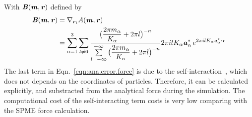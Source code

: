 \documentclass[aps,pre,preprint]{revtex4}
\renewcommand{\v}[1]{\textbf{\textit{#1}}}
\begin{document}
With $\v B(\v m, \v r)$ defined by
\begin{align}\nonumber
  \v B(\v m, \v r)
  &=
  \nabla_{\v r_i}A(\v m, \v r)\\
  &=
  \sum_{\alpha=1}^3\sum_{l\neq 0}
  \frac
  {\big(\dfrac{2\pi m_\alpha}{K_\alpha} + 2\pi l\big)^{-n}}
  {\sum\limits_{l=-\infty}^{+\infty}
    \big(\dfrac{2\pi m_\alpha}{K_\alpha} + 2\pi l\big)^{-n}}
  2\pi i l K_\alpha\v a_\alpha^\ast\,e^{2\pi i l K_\alpha\v a^\ast_\alpha\cdot \v r} 
\end{align}
The last term in Eqn.~\eqref{eqn:ana.error.force} is due to the
self-interaction~\cite{cerutti2009staggered, ballenegger2011removal,
  neelov2010interlaced}, which does not depends on the coordinates of
particles. Therefore, it can be calculated explicitly, and substracted
from the analytical force during the simulation. The computational cost of
the self-interacting term costs is very low comparing with the SPME
force calculation.
\end{document}
